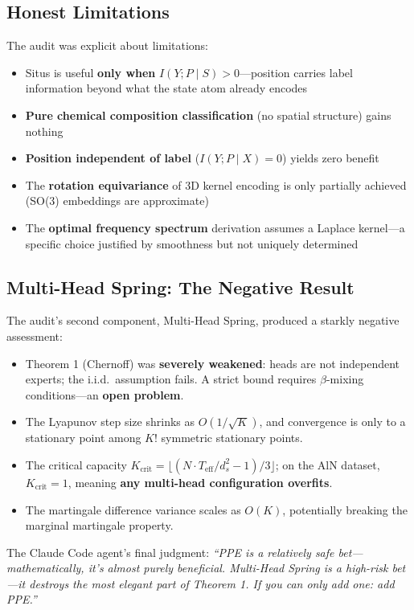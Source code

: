 \documentclass[12pt,a4paper]{ctexart}
\begin{document}
\subsection{Honest Limitations}

The audit was explicit about limitations:
\begin{itemize}
\item Situs is useful \textbf{only when} $I(Y; P \mid S) > 0$—position carries label information beyond what the state atom already encodes
\item \textbf{Pure chemical composition classification} (no spatial structure) gains nothing
\item \textbf{Position independent of label} ($I(Y; P \mid X) = 0$) yields zero benefit
\item The \textbf{rotation equivariance} of 3D kernel encoding is only partially achieved (SO(3) embeddings are approximate)
\item The \textbf{optimal frequency spectrum} derivation assumes a Laplace kernel—a specific choice justified by smoothness but not uniquely determined
\end{itemize}

\subsection{Multi-Head Spring: The Negative Result}

The audit's second component, Multi-Head Spring, produced a starkly negative assessment:
\begin{itemize}
\item Theorem 1 (Chernoff) was \textbf{severely weakened}: heads are not independent experts; the i.i.d.\ assumption fails. A strict bound requires $\beta$-mixing conditions—an \textbf{open problem}.
\item The Lyapunov step size shrinks as $O(1/\sqrt{K})$, and convergence is only to a stationary point among $K!$ symmetric stationary points.
\item The critical capacity $K_{\text{crit}} = \lfloor(N \cdot T_{\text{eff}} / d_s^2 - 1)/3\rfloor$; on the AlN dataset, $K_{\text{crit}} = 1$, meaning \textbf{any multi-head configuration overfits}.
\item The martingale difference variance scales as $O(K)$, potentially breaking the marginal martingale property.
\end{itemize}

The Claude Code agent's final judgment: \textit{``PPE is a relatively safe bet—mathematically, it's almost purely beneficial. Multi-Head Spring is a high-risk bet—it destroys the most elegant part of Theorem 1. If you can only add one: add PPE.''}
\end{document}
